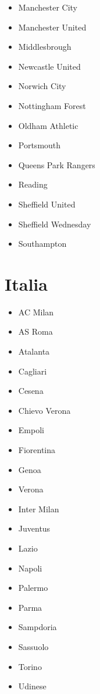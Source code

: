 \begin{multicols}{2}
\begin{itemize}
		\item Manchester City

		\item Manchester United

		\item Middlesbrough

		\item Newcastle United

		\item Norwich City

		\item Nottingham Forest

		\item Oldham Athletic

		\item Portsmouth

		\item Queens Park Rangers

		\item Reading

		\item Sheffield United

		\item Sheffield Wednesday

		\item Southampton
		
	\end{itemize}
\end{multicols}


\section{Italia}
\begin{multicols}{2}
	\begin{itemize}
	    \setlength{\itemsep}{1pt}
	    \setlength{\parskip}{0pt}
	    \setlength{\parsep}{0pt}
		\item AC Milan
		\item AS Roma
		\item Atalanta
		\item Cagliari
		\item Cesena
		\item Chievo Verona
		\item Empoli
		\item Fiorentina
		\item Genoa
		\item Verona
		\item Inter Milan
		\item Juventus
		\item Lazio
		\item Napoli
		\item Palermo
		\item Parma
		\item Sampdoria
		\item Sassuolo
		\item Torino
		\item Udinese
	\end{itemize}
\end{multicols}

